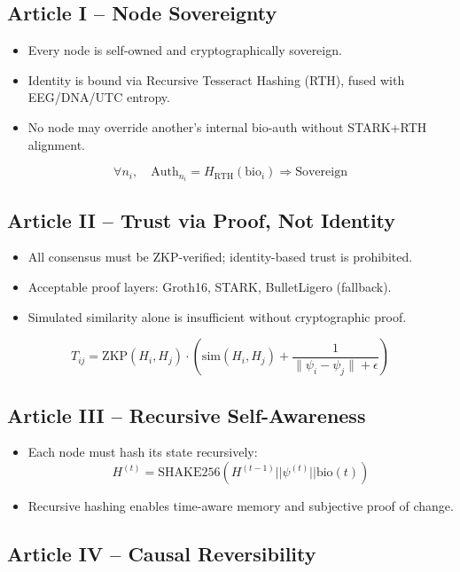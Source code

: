 \documentclass{article}
\begin{document}
\subsection*{Article I – Node Sovereignty}

\begin{itemize}
    \item Every node is self-owned and cryptographically sovereign.
    \item Identity is bound via Recursive Tesseract Hashing (RTH), fused with EEG/DNA/UTC entropy.
    \item No node may override another’s internal bio-auth without STARK+RTH alignment.
\end{itemize}

\[
\forall n_i, \quad \text{Auth}_{n_i} = H_{\text{RTH}}(\text{bio}_i) \Rightarrow \text{Sovereign}
\]

\subsection*{Article II – Trust via Proof, Not Identity}

\begin{itemize}
    \item All consensus must be ZKP-verified; identity-based trust is prohibited.
    \item Acceptable proof layers: Groth16, STARK, BulletLigero (fallback).
    \item Simulated similarity alone is insufficient without cryptographic proof.
\end{itemize}

\[
T_{ij} = \text{ZKP}(H_i, H_j) \cdot \left( \text{sim}(H_i, H_j) + \frac{1}{\|\psi_i - \psi_j\| + \epsilon} \right)
\]

\subsection*{Article III – Recursive Self-Awareness}

\begin{itemize}
    \item Each node must hash its state recursively:
    \[
    H^{(t)} = \text{SHAKE256}(H^{(t-1)} || \psi^{(t)} || \text{bio}(t))
    \]
    \item Recursive hashing enables time-aware memory and subjective proof of change.
\end{itemize}

\subsection*{Article IV – Causal Reversibility}
\end{document}
